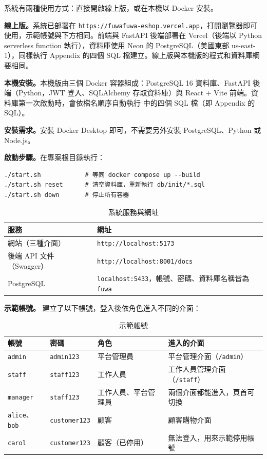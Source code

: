 系統有兩種使用方式：直接開啟線上版，或在本機以 Docker 安裝。

\textbf{線上版。}系統已部署在 \texttt{https://fuwafuwa-eshop.vercel.app}，打開瀏覽器即可使用，示範帳號與下方相同。前端與 FastAPI 後端部署在 Vercel（後端以 Python serverless function 執行），資料庫使用 Neon 的 PostgreSQL（美國東部 us-east-1），同樣執行 Appendix 的四個 SQL 檔建立。線上版與本機版的程式和資料庫綱要相同。

\textbf{本機安裝。}本機版由三個 Docker 容器組成：PostgreSQL 16 資料庫、FastAPI 後端（Python，JWT 登入、SQLAlchemy 存取資料庫）與 React + Vite 前端。資料庫第一次啟動時，會依檔名順序自動執行  中的四個 SQL 檔（即 Appendix 的 SQL）。

\textbf{安裝需求。}安裝 Docker Desktop 即可，不需要另外安裝 PostgreSQL、Python 或 Node.js。

\textbf{啟動步驟。}在專案根目錄執行：
\begin{Verbatim}[fontsize=\small,xleftmargin=2em]
./start.sh            # 等同 docker compose up --build
./start.sh reset      # 清空資料庫，重新執行 db/init/*.sql
./start.sh down       # 停止所有容器
\end{Verbatim}

\begingroup\small
\begin{xltabular}{\linewidth}{|>{\raggedright\arraybackslash}p{4cm}|>{\raggedright\arraybackslash}X|}
\caption{系統服務與網址}\\
\hline{}\textbf{服務} & \textbf{網址}\\\hline\endhead
網站（三種介面） & \texttt{http://localhost:5173}\\\hline
後端 API 文件（Swagger） & \texttt{http://localhost:8001/docs}\\\hline
PostgreSQL & \texttt{localhost:5433}，帳號、密碼、資料庫名稱皆為 \texttt{fuwa}\\\hline
\end{xltabular}
\endgroup

\textbf{示範帳號。} 建立了以下帳號，登入後依角色進入不同的介面：

\begingroup\small
\begin{xltabular}{\linewidth}{|>{\raggedright\arraybackslash}p{2cm}|>{\raggedright\arraybackslash}p{2.4cm}|>{\raggedright\arraybackslash}p{3.4cm}|>{\raggedright\arraybackslash}X|}
\caption{示範帳號}\\
\hline{}\textbf{帳號} & \textbf{密碼} & \textbf{角色} & \textbf{進入的介面}\\\hline\endhead
\texttt{admin} & \texttt{admin123} & 平台管理員 & 平台管理介面（\texttt{/admin}）\\\hline
\texttt{staff} & \texttt{staff123} & 工作人員 & 工作人員管理介面（\texttt{/staff}）\\\hline
\texttt{manager} & \texttt{staff123} & 工作人員、平台管理員 & 兩個介面都能進入，頁首可切換\\\hline
\texttt{alice}、\texttt{bob} & \texttt{customer123} & 顧客 & 顧客購物介面\\\hline
\texttt{carol} & \texttt{customer123} & 顧客（已停用） & 無法登入，用來示範停用帳號\\\hline
\end{xltabular}
\endgroup
